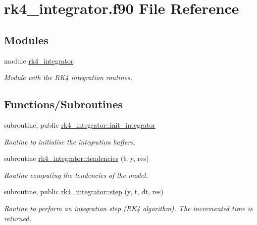 \hypertarget{rk4__integrator_8f90}{}\section{rk4\+\_\+integrator.\+f90 File Reference}
\label{rk4__integrator_8f90}
\subsection*{Modules}
\begin{DoxyCompactItemize}
\item 
module \hyperlink{namespacerk4__integrator}{rk4\+\_\+integrator}
\begin{DoxyCompactList}\small\item\em Module with the R\+K4 integration routines. \end{DoxyCompactList}\end{DoxyCompactItemize}
\subsection*{Functions/\+Subroutines}
\begin{DoxyCompactItemize}
\item 
subroutine, public \hyperlink{namespacerk4__integrator_a51e9520d63269423a2341750219a7657}{rk4\+\_\+integrator\+::init\+\_\+integrator}
\begin{DoxyCompactList}\small\item\em Routine to initialise the integration buffers. \end{DoxyCompactList}\item 
subroutine \hyperlink{namespacerk4__integrator_ad63cb6e7a042c91280e6d7d1dd8486aa}{rk4\+\_\+integrator\+::tendencies} (t, y, res)
\begin{DoxyCompactList}\small\item\em Routine computing the tendencies of the model. \end{DoxyCompactList}\item 
subroutine, public \hyperlink{namespacerk4__integrator_a3599b8d3b64a4c1b04a859aa4454b32b}{rk4\+\_\+integrator\+::step} (y, t, dt, res)
\begin{DoxyCompactList}\small\item\em Routine to perform an integration step (R\+K4 algorithm). The incremented time is returned. \end{DoxyCompactList}\end{DoxyCompactItemize}
